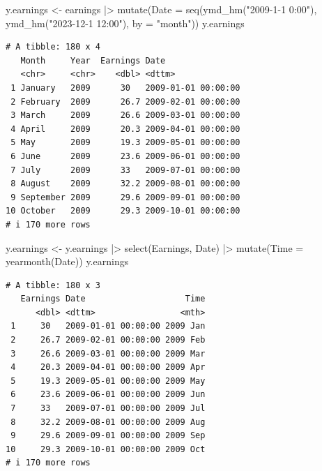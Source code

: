 \documentclass[
  11pt,
  a4paper,
]{report}
\newenvironment{Shaded}{\begin{snugshade}}{\end{snugshade}}
\newcommand{\AttributeTok}[1]{\textcolor[rgb]{0.40,0.45,0.13}{#1}}
\newcommand{\FunctionTok}[1]{\textcolor[rgb]{0.28,0.35,0.67}{#1}}
\newcommand{\NormalTok}[1]{\textcolor[rgb]{0.00,0.23,0.31}{#1}}
\newcommand{\OtherTok}[1]{\textcolor[rgb]{0.00,0.23,0.31}{#1}}
\newcommand{\SpecialCharTok}[1]{\textcolor[rgb]{0.37,0.37,0.37}{#1}}
\newcommand{\StringTok}[1]{\textcolor[rgb]{0.13,0.47,0.30}{#1}}
\begin{document}
\begin{Shaded}
\begin{Highlighting}[]
\NormalTok{y.earnings }\OtherTok{\textless{}{-}}\NormalTok{ earnings }\SpecialCharTok{|\textgreater{}} \FunctionTok{mutate}\NormalTok{(}\AttributeTok{Date =} \FunctionTok{seq}\NormalTok{(}\FunctionTok{ymd\_hm}\NormalTok{(}\StringTok{"2009{-}1{-}1 0:00"}\NormalTok{), }\FunctionTok{ymd\_hm}\NormalTok{(}\StringTok{"2023{-}12{-}1 12:00"}\NormalTok{), }\AttributeTok{by =} \StringTok{"month"}\NormalTok{))}
\NormalTok{y.earnings}
\end{Highlighting}
\end{Shaded}

\begin{verbatim}
# A tibble: 180 x 4
   Month     Year  Earnings Date               
   <chr>     <chr>    <dbl> <dttm>             
 1 January   2009      30   2009-01-01 00:00:00
 2 February  2009      26.7 2009-02-01 00:00:00
 3 March     2009      26.6 2009-03-01 00:00:00
 4 April     2009      20.3 2009-04-01 00:00:00
 5 May       2009      19.3 2009-05-01 00:00:00
 6 June      2009      23.6 2009-06-01 00:00:00
 7 July      2009      33   2009-07-01 00:00:00
 8 August    2009      32.2 2009-08-01 00:00:00
 9 September 2009      29.6 2009-09-01 00:00:00
10 October   2009      29.3 2009-10-01 00:00:00
# i 170 more rows
\end{verbatim}

\begin{Shaded}
\begin{Highlighting}[]
\NormalTok{y.earnings }\OtherTok{\textless{}{-}}\NormalTok{ y.earnings }\SpecialCharTok{|\textgreater{}}
  \FunctionTok{select}\NormalTok{(Earnings, Date) }\SpecialCharTok{|\textgreater{}} \FunctionTok{mutate}\NormalTok{(}\AttributeTok{Time =} \FunctionTok{yearmonth}\NormalTok{(Date))}
\NormalTok{y.earnings}
\end{Highlighting}
\end{Shaded}

\begin{verbatim}
# A tibble: 180 x 3
   Earnings Date                    Time
      <dbl> <dttm>                 <mth>
 1     30   2009-01-01 00:00:00 2009 Jan
 2     26.7 2009-02-01 00:00:00 2009 Feb
 3     26.6 2009-03-01 00:00:00 2009 Mar
 4     20.3 2009-04-01 00:00:00 2009 Apr
 5     19.3 2009-05-01 00:00:00 2009 May
 6     23.6 2009-06-01 00:00:00 2009 Jun
 7     33   2009-07-01 00:00:00 2009 Jul
 8     32.2 2009-08-01 00:00:00 2009 Aug
 9     29.6 2009-09-01 00:00:00 2009 Sep
10     29.3 2009-10-01 00:00:00 2009 Oct
# i 170 more rows
\end{verbatim}
\end{document}
